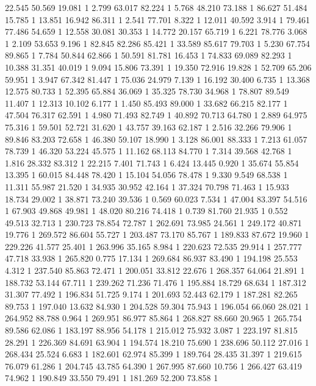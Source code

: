 	22.545	50.569	19.081	1
	2.799	63.017	82.224	1
	5.768	48.210	73.188	1
	86.627	51.484	15.785	1
	13.851	16.942	86.311	1
	2.541	77.701	8.322	1
	12.011	40.592	3.914	1
	79.461	77.486	54.659	1
	12.558	30.081	30.353	1
	14.772	20.157	65.719	1
	6.221	78.776	3.068	1
	2.109	53.653	9.196	1
	82.845	82.286	85.421	1
	33.589	85.617	79.703	1
	5.230	67.754	89.865	1
	7.784	50.844	62.866	1
	50.591	81.781	16.453	1
	74.833	69.089	82.293	1
	10.388	31.351	40.019	1
	9.094	15.806	73.391	1
	19.350	72.916	19.828	1
	52.709	65.206	59.951	1
	3.947	67.342	81.447	1
	75.036	24.979	7.139	1
	16.192	30.400	6.735	1
	13.368	12.575	80.733	1
	52.395	65.884	36.069	1
	35.325	78.730	34.968	1
	78.807	89.549	11.407	1
	12.313	10.102	6.177	1
	1.450	85.493	89.000	1
	33.682	66.215	82.177	1
	47.504	76.317	62.591	1
	4.980	71.493	82.749	1
	40.892	70.713	64.780	1
	2.889	64.975	75.316	1
	59.501	52.721	31.620	1
	43.757	39.163	62.187	1
	2.516	32.266	79.906	1
	89.846	83.203	72.658	1
	46.380	59.107	18.990	1
	3.128	86.001	88.333	1
	7.213	61.057	78.739	1
	46.320	53.224	45.575	1
	11.162	68.113	84.770	1
	7.314	39.568	42.768	1
	1.816	28.332	83.312	1
	22.215	7.401	71.743	1
	6.424	13.445	0.920	1
	35.674	55.854	13.395	1
	60.015	84.448	78.420	1
	15.104	54.056	78.478	1
	9.330	9.549	68.538	1
	11.311	55.987	21.520	1
	34.935	30.952	42.164	1
	37.324	70.798	71.463	1
	15.933	18.734	29.002	1
	38.871	73.240	39.536	1
	0.569	60.023	7.534	1
	47.004	83.397	54.516	1
	67.903	49.868	49.981	1
	48.020	80.216	74.418	1
	0.739	81.760	21.935	1
	0.552	49.513	32.713	1
	230.723	78.854	72.787	1
	262.691	73.985	24.561	1
	249.172	40.871	19.776	1
	269.572	86.604	55.727	1
	203.487	73.170	85.767	1
	189.833	87.672	19.960	1
	229.226	41.577	25.401	1
	263.996	35.165	8.984	1
	220.623	72.535	29.914	1
	257.777	47.718	33.938	1
	265.820	0.775	17.134	1
	269.684	86.937	83.490	1
	194.198	25.553	4.312	1
	237.540	85.863	72.471	1
	200.051	33.812	22.676	1
	268.357	64.064	21.891	1
	188.732	53.144	67.711	1
	239.262	71.236	71.476	1
	195.884	18.729	68.634	1
	187.312	31.307	77.492	1
	196.834	51.725	9.174	1
	201.693	52.443	62.179	1
	187.281	82.265	89.753	1
	197.040	13.632	84.930	1
	204.528	59.304	75.943	1
	196.054	66.060	28.021	1
	264.952	88.788	0.964	1
	269.951	86.977	85.864	1
	268.827	88.660	20.965	1
	265.754	89.586	62.086	1
	183.197	88.956	54.178	1
	215.012	75.932	3.087	1
	223.197	81.815	28.291	1
	226.369	84.691	63.904	1
	194.574	18.210	75.690	1
	238.696	50.112	27.016	1
	268.434	25.524	6.683	1
	182.601	62.974	85.399	1
	189.764	28.435	31.397	1
	219.615	76.079	61.286	1
	204.745	43.785	64.390	1
	267.995	87.660	10.756	1
	266.427	63.419	74.962	1
	190.849	33.550	79.491	1
	181.269	52.200	73.858	1
